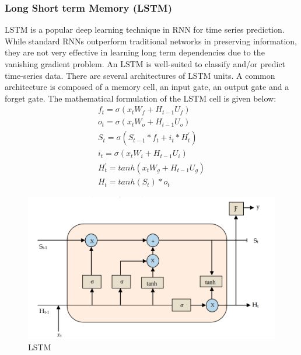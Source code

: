 \subsubsection{Long Short term Memory (LSTM)}
\vspace{-18pt}
LSTM is a popular deep learning technique in RNN for time series prediction. While standard RNNs outperform traditional networks in preserving information, they are not very effective in learning long term dependencies due to the vanishing gradient problem. An LSTM is well-suited to classify and/or predict time-series data. There are several architectures of LSTM units. A common architecture is composed of a memory cell, an input gate, an output gate and a forget gate. The mathematical formulation of the LSTM cell is given below:
\begin{eqnarray}
f_t = \sigma(x_tW_f + H_{t-1}U_f)\\
o_t = \sigma(x_tW_o + H_{t-1}U_o)\\
S_t = \sigma(S_{t-1} *f_t + i_t * H^{'}_t)\\
i_t = \sigma(x_tW_i + H_{t-1}U_i)\\
H^{'}_t = tanh(x_tW_g + H_{t-1}U_g)\\
H_t = tanh(S_t)*o_t
\end{eqnarray}
\begin{figure}[tbh] %
\begin{center}
	\includegraphics[width=6in]{images/l1.png} 
	\caption{LSTM} %
	\label{LSTM} %
\end{center}
\end{figure}
\newpage
